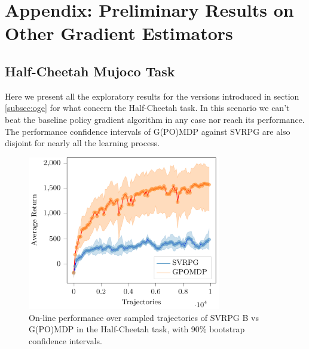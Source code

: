 \chapter{Appendix: Preliminary Results on Other Gradient Estimators}\label{chap:appendix}

\section{Half-Cheetah Mujoco Task}
\vspace{-0.05in}
Here we present all the exploratory results for the versions introduced in section \ref{subsec:oge} for what concern the Half-Cheetah task. In this scenario we can't beat the baseline policy gradient algorithm in any case nor reach its performance. The performance confidence intervals of G(PO)MDP against \acs{SVRPG} are also disjoint for nearly all the learning process.
\begin{figure}[h]
	\begin{minipage}[h]{1\textwidth}
		\centering
		\includegraphics[width=0.75\textwidth]{Images/Experiments/half_cheetah_GPOMDP_vs_NonSelf_SVRPG_B.pdf}
		\vspace{-0.1in}
		\caption{On-line performance over sampled trajectories of \acs{SVRPG} B vs G(PO)MDP in the Half-Cheetah task, with 90\% bootstrap confidence intervals.}
		\label{fig:hcthree}
	\end{minipage}
	\vspace{-0.15in}
\end{figure}
